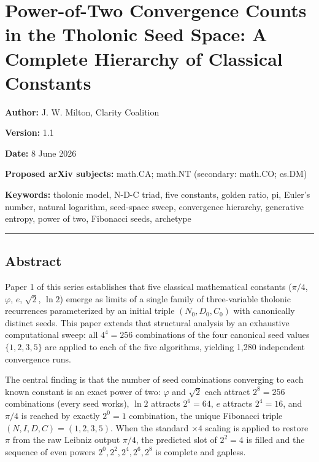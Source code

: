 \documentclass[
  11pt,
  letterpaper,
]{article}
\author{}
\date{}
\begin{document}
\section{Power-of-Two Convergence Counts in the Tholonic Seed Space: A
Complete Hierarchy of Classical
Constants}\label{power-of-two-convergence-counts-in-the-tholonic-seed-space-a-complete-hierarchy-of-classical-constants}

\textbf{Author:} J. W. Milton, Clarity Coalition

\textbf{Version:} 1.1

\textbf{Date:} 8 June 2026

\textbf{Proposed arXiv subjects:} math.CA; math.NT (secondary: math.CO;
cs.DM)

\textbf{Keywords:} tholonic model, N-D-C triad, five constants, golden
ratio, pi, Euler's number, natural logarithm, seed-space sweep,
convergence hierarchy, generative entropy, power of two, Fibonacci
seeds, archetype

\begin{center}\rule{0.5\linewidth}{0.5pt}\end{center}

\subsection{Abstract}\label{abstract}

Paper 1 of this series establishes that five classical mathematical
constants (\(\pi/4\), \(\varphi\), \(e\), \(\sqrt{2}\), \(\ln 2\))
emerge as limits of a single family of three-variable tholonic
recurrences parameterized by an initial triple \((N_0, D_0, C_0)\) with
canonically distinct seeds. This paper extends that structural analysis
by an exhaustive computational sweep: all \(4^4 = 256\) combinations of
the four canonical seed values \(\{1, 2, 3, 5\}\) are applied to each of
the five algorithms, yielding 1,280 independent convergence runs.

The central finding is that the number of seed combinations converging
to each known constant is an exact power of two: \(\varphi\) and
\(\sqrt{2}\) each attract \(2^8 = 256\) combinations (every seed works),
\(\ln 2\) attracts \(2^6 = 64\), \(e\) attracts \(2^4 = 16\), and
\(\pi/4\) is reached by exactly \(2^0 = 1\) combination, the unique
Fibonacci triple \((N, I, D, C) = (1, 2, 3, 5)\). When the standard
\(\times 4\) scaling is applied to restore \(\pi\) from the raw Leibniz
output \(\pi/4\), the predicted slot of \(2^2 = 4\) is filled and the
sequence of even powers \(2^0, 2^2, 2^4, 2^6, 2^8\) is complete and
gapless.
\end{document}

